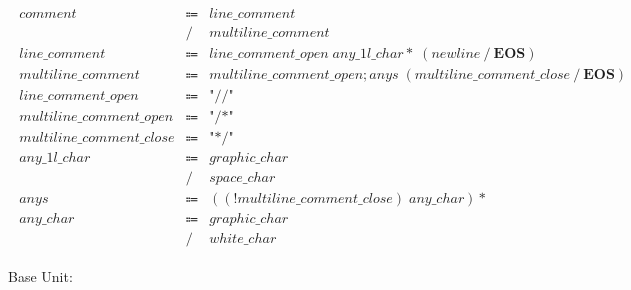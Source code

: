 \begin{align*}
    \begin{array}{rcll}
        \mathit{comment}
        &\Coloneq &\mathit{line\_comment} \\
        &\mathrel{/} &\mathit{multiline\_comment} \\
        \mathit{line\_comment}
        &\Coloneq &\mathit{line\_comment\_open}\; \mathit{any\_1l\_char}{*}\; (\mathit{newline} \mathrel{/} \mathbf{EOS}) \\
        \mathit{multiline\_comment}
        &\Coloneq &\mathit{multiline\_comment\_open}; \mathit{anys}\; (\mathit{multiline\_comment\_close} \mathrel{/} \mathbf{EOS}) \\
        \mathit{line\_comment\_open}
        &\Coloneq &\texttt{"//"} \\
        \mathit{multiline\_comment\_open}
        &\Coloneq &\texttt{"/*"} \\
        \mathit{multiline\_comment\_close}
        &\Coloneq &\texttt{"*/"} \\
        \mathit{any\_1l\_char}
        &\Coloneq &\mathit{graphic\_char} \\
        &\mathrel{/} &\mathit{space\_char} \\
        \mathit{anys}
        &\Coloneq &((\mathop{!} \mathit{multiline\_comment\_close})\; \mathit{any\_char}){*} \\
        \mathit{any\_char}
        &\Coloneq &\mathit{graphic\_char} \\
        &\mathrel{/} &\mathit{white\_char}
    \end{array}
\end{align*}

Base Unit:

